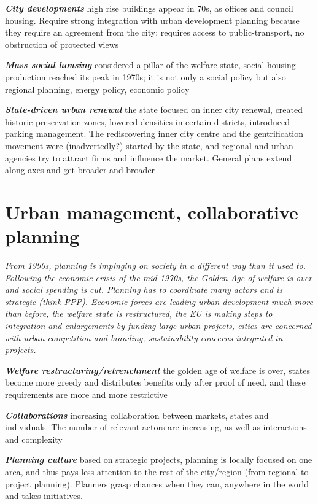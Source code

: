 \documentclass{article}
\newcommand{\bisection}[1]{\textbf{\textit{#1}}}
\newcommand{\alignedmarginpar}[1]{%
        \marginpar{\raggedright\small #1}
    }
\begin{document}
\bisection{City developments}\alignedmarginpar{Donau City} high rise buildings appear in 70s, as offices and council housing. Require strong integration with urban development planning because they require an agreement from the city: requires access to public-transport, no obstruction of protected views

\bisection{Mass social housing} considered a pillar of the welfare state, social housing production reached its peak in 1970s; it is not only a social policy but also regional planning, energy policy, economic policy

\bisection{State-driven urban renewal}\alignedmarginpar{Sweden's distinct housing regime} the state focused on inner city renewal, created historic preservation zones, lowered densities in certain districts, introduced parking management. The rediscovering inner city centre and the gentrification movement were (inadvertedly?) started by the state, and regional and urban agencies try to attract firms and influence the market. General plans extend along axes and get broader and broader

\pagebreak
\section{Urban management, collaborative planning}

\textit{From 1990s, planning is impinging on society in a different way than it used to. Following the economic crisis of the mid-1970s, the Golden Age of welfare is over and social spending is cut. Planning has to coordinate many actors and is strategic (think PPP). Economic forces are leading urban development much more than before, the welfare state is restructured, the EU is making steps to integration and enlargements by funding large urban projects, cities are concerned with urban competition and branding, sustainability concerns integrated in projects.}

\bisection{Welfare restructuring/retrenchment} the golden age of welfare is over, states become more greedy and distributes benefits only after proof of need, and these requirements are more and more restrictive

\bisection{Collaborations} increasing collaboration between markets, states and individuals. The number of relevant actors are increasing, as well as interactions and complexity

\bisection{Planning culture} based on strategic projects, planning is locally focused on one area, and thus pays less attention to the rest of the city/region (from regional to project planning). Planners grasp chances when they can, anywhere in the world and takes initiatives.
\end{document}
